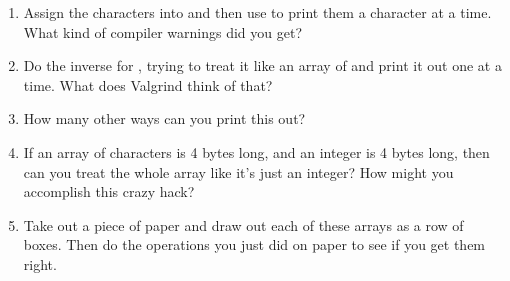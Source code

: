 \begin{enumerate}
\item Assign the characters into  and then use 
    to print them a character at a time.  What kind of compiler warnings 
    did you get?
\item Do the inverse for , trying to treat it like an array
    of  and print it out one  at a time.  What
    does Valgrind think of that?
\item How many other ways can you print this out?
\item If an array of characters is 4 bytes long, and an integer is 4 bytes
    long, then can you treat the whole  array like it's just
    an integer?  How might you accomplish this crazy hack?
\item Take out a piece of paper and draw out each of these arrays as a
    row of boxes. Then do the operations you just did on paper to see
    if you get them right.
\end{enumerate}


